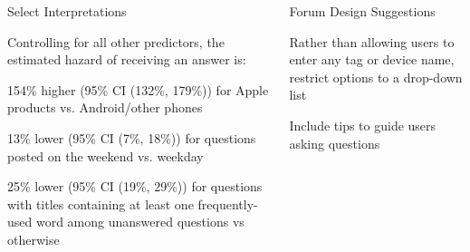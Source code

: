 \documentclass[final]{beamer}
\newlength{\onecolwid}
\newlength{\twocolwid}
\begin{document}
\begin{frame}[t]
\begin{columns}[t]
\begin{column}{\twocolwid}
\vspace{1.8ex}




\begin{columns}[t,totalwidth=\twocolwid] %

\begin{column}{\onecolwid} %


\begin{block}{Select Interpretations}

Controlling for all other predictors, the estimated hazard of receiving an answer is:

\vspace{1ex}

\textcolor{dblue!70}{} 154\% higher (95\% CI (132\%, 179\%)) for Apple products vs. Android/other phones

\vspace{1ex}

\textcolor{dblue!70}{} 13\% lower (95\% CI (7\%, 18\%)) for questions posted on the weekend vs. weekday

\vspace{1ex}

\textcolor{dblue!70}{} 25\% lower (95\% CI (19\%, 29\%)) for questions with titles containing at least one frequently-used word among unanswered questions vs otherwise

\end{block}


\end{column} %

\begin{column}{\onecolwid} %

\begin{block}{Forum Design Suggestions}

\textcolor{dblue!70}{} Rather than allowing users to enter any tag or device name, restrict options to a drop-down list

\vspace{0.75ex}

\textcolor{dblue!70}{} Include tips to guide users asking questions 


\end{block}
\end{column}
\end{columns}
\end{column}
\end{columns}
\end{frame}
\end{document}
